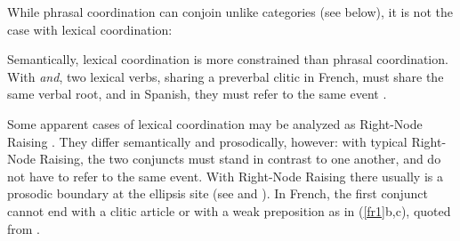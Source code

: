 \documentclass[output=paper
                ,modfonts
                ,nonflat
	        ,collection
	        ,collectionchapter
	        ,collectiontoclongg
 	        ,biblatex
                ,babelshorthands
                ,newtxmath
                ,draftmode
                ,colorlinks, citecolor=brown
]{./langsci/langscibook}
\begin{document}
{While phrasal coordination can conjoin unlike categories (see below), it is not the case with lexical coordination:

\begin{exe}
 \ex
\begin{xlista}
\end{xlista}
\end{exe}

Semantically, lexical coordination is more constrained than phrasal coordination. With \textit{and}, two lexical verbs, sharing a preverbal clitic in French, must share the same verbal root, and in Spanish, they must refer to the same event \citep{Bosque:86}.

\eal
{}
\zl

Some apparent cases of lexical coordination may be analyzed as Right-Node Raising \citep{Beavers}. They differ semantically and prosodically, however: with typical Right-Node Raising, the two conjuncts must stand in contrast to one another, and do not have to refer to the same event. With Right-Node Raising there usually is a prosodic boundary at the ellipsis site (see \citet[843,844]{chavesrnr}\addpages and ). In French, the first conjunct cannot end with a clitic article or with a weak preposition as in (\ref{fr1}b,c), quoted from \citep[]{Abeille:06}.

}
\end{document}
